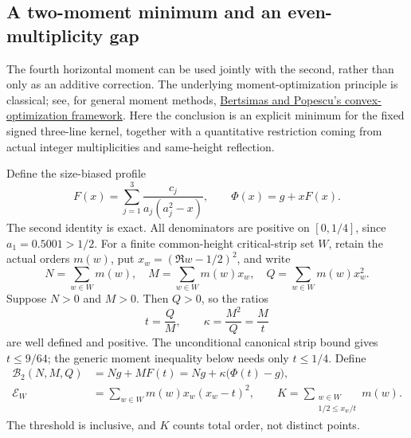 \subsection{A two-moment minimum and an even-multiplicity gap}
\label{sec:moment-ratio-lattice}

The fourth horizontal moment can be used jointly with the second, rather
than only as an additive correction.  The underlying moment-optimization
principle is classical; see, for general moment methods,
\href{https://www.mit.edu/~dbertsim/papers/MomentProblems/Optimal-inequalities-in-probability-theory-A-convex-optimization-approach-SIAM15.pdf}
{Bertsimas and Popescu's convex-optimization framework}.
Here the conclusion is an explicit minimum for the fixed signed
three-line kernel, together with a quantitative restriction coming from
actual integer multiplicities and same-height reflection.

Define the size-biased profile
\[
 F(x)=\sum_{j=1}^3\frac{c_j}{a_j(a_j^2-x)},\qquad
 \Phi(x)=g+xF(x).
\]
The second identity is exact.  All denominators are positive on
\([0,1/4]\), since \(a_1=0.5001>1/2\).
For a finite common-height critical-strip set \(W\), retain the actual
orders \(m(w)\), put \(x_w=(\Re w-1/2)^2\), and write
\[
 N=\sum_{w\in W}m(w),\quad
 M=\sum_{w\in W}m(w)x_w,\quad
 Q=\sum_{w\in W}m(w)x_w^2.
\]
Suppose \(N>0\) and \(M>0\).  Then \(Q>0\), so the ratios
\[
 t=\frac QM,\qquad \kappa=\frac{M^2}{Q}=\frac Mt
\]
are well defined and positive.  The unconditional canonical strip bound
gives \(t\le9/64\); the generic moment inequality below needs only
\(t\le1/4\).  Define
\begin{align}
 \mathcal B_2(N,M,Q)
   &=Ng+MF(t)=Ng+\kappa\bigl(\Phi(t)-g\bigr),
       \label{eq:moment-ratio-base}\\
 \mathcal E_W&=\sum_{w\in W}m(w)x_w(x_w-t)^2,\qquad
 K=\sum_{\substack{w\in W\\1/2\le x_w/t}}m(w).
       \label{eq:moment-ratio-threshold}
\end{align}
The threshold is inclusive, and \(K\) counts total order, not distinct
points.

